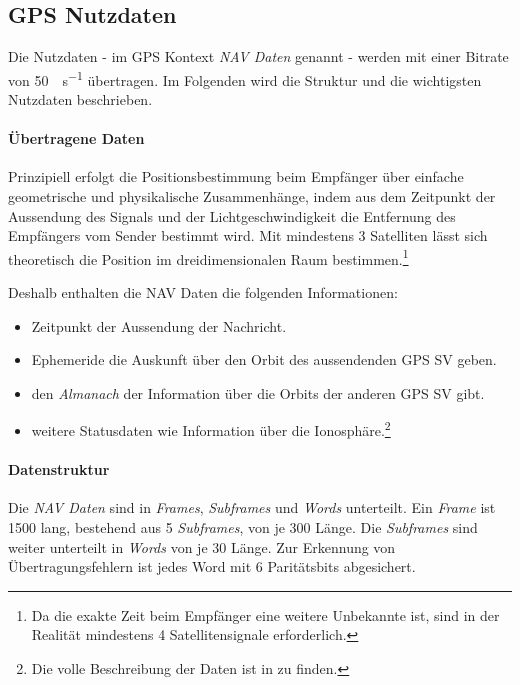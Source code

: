 
\subsection{GPS Nutzdaten}
Die Nutzdaten - im GPS Kontext \emph{NAV Daten} genannt - werden mit einer Bitrate von \SI{50}{\bit\per\second} übertragen. Im Folgenden wird die Struktur und die wichtigsten Nutzdaten beschrieben.

\paragraph{Übertragene Daten}
Prinzipiell erfolgt die Positionsbestimmung beim Empfänger über einfache geometrische und physikalische Zusammenhänge, indem aus dem Zeitpunkt der Aussendung des Signals und der Lichtgeschwindigkeit die Entfernung des Empfängers vom Sender bestimmt wird. Mit mindestens 3 Satelliten lässt sich theoretisch die Position im dreidimensionalen Raum bestimmen.\footnote{Da die exakte Zeit beim Empfänger eine weitere Unbekannte ist, sind in der Realität mindestens 4 Satellitensignale erforderlich.}

Deshalb enthalten die NAV Daten die folgenden Informationen:
\begin{itemize}
\item Zeitpunkt der Aussendung der Nachricht.
\item Ephemeride die Auskunft über den Orbit des aussendenden GPS \gls{SV} geben.
\item den \emph{Almanach} der Information über die Orbits der anderen GPS \gls{SV} gibt.
\item weitere Statusdaten wie Information über die Ionosphäre.\footnote{Die volle Beschreibung der Daten ist in \cite{specification2010gps} zu finden.}
\end{itemize}

\paragraph{Datenstruktur}
Die \emph{NAV Daten} sind in \emph{Frames}, \emph{Subframes} und \emph{Words} unterteilt. Ein \emph{Frame} ist \SI{1500}{\bit} lang, bestehend aus 5 \emph{Subframes}, von je \SI{300}{\bit} Länge. Die \emph{Subframes} sind weiter unterteilt in \emph{Words} von je \SI{30}{\bit} Länge. Zur Erkennung von Übertragungsfehlern ist jedes Word mit 6 Paritätsbits abgesichert. 

